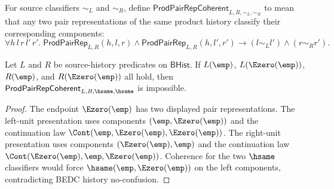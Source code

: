 \begin{definition}
\label{def:prod-pair-rep-coherent}
For source classifiers $\sim_L$ and $\sim_R$, define
$\mathsf{ProdPairRepCoherent}_{L,R,\sim_L,\sim_R}$ to mean that any two pair
representations of the same product history classify their corresponding
components:
$$
  \forall h\,l\,r\,l'\,r'.\;
  \mathsf{ProdPairRep}_{L,R}(h,l,r)\wedge
  \mathsf{ProdPairRep}_{L,R}(h,l',r')
  \to (l\sim_L l')\wedge(r\sim_R r').
$$
\end{definition}

\begin{theorem}
\label{thm:prod-pair-rep-e0-unit-coherence-absurd}
Let $L$ and $R$ be source-history predicates on $\mathsf{BHist}$. If $L(\emp)$,
$L(\Ezero(\emp))$, $R(\emp)$, and $R(\Ezero(\emp))$ all hold, then
$\mathsf{ProdPairRepCoherent}_{L,R,\hsame,\hsame}$ is impossible.
\end{theorem}
\begin{proof}
The endpoint $\Ezero(\emp)$ has two displayed pair representations. The
left-unit presentation uses components $(\emp,\Ezero(\emp))$ and the
continuation law $\Cont(\emp,\Ezero(\emp),\Ezero(\emp))$. The right-unit
presentation uses components $(\Ezero(\emp),\emp)$ and the continuation law
$\Cont(\Ezero(\emp),\emp,\Ezero(\emp))$. Coherence for the two $\hsame$
classifiers would force $\hsame(\emp,\Ezero(\emp))$ on the left components,
contradicting BEDC history no-confusion.
\end{proof}

